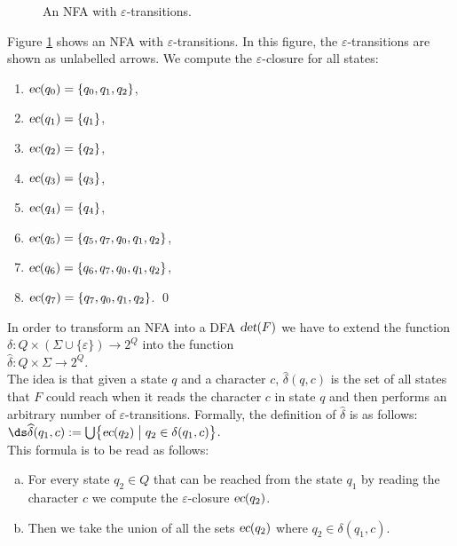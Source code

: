 \begin{figure}[!ht]
  \centering

   \caption{An \textsc{NFA} with $\varepsilon$-transitions.}
  \label{fig:ab-or-ba-star.dot}
\end{figure}

\exampleEng
Figure \ref{fig:ab-or-ba-star.dot} shows an \textsc{NFA} with 
$\varepsilon$-transitions.   In this figure, the $\varepsilon$-transitions are shown as unlabelled arrows.
We compute the $\varepsilon$-closure for all states:
\begin{enumerate}
\item $\textsl{ec}(q_0) = \{ q_0, q_1, q_2 \}$,
\item $\textsl{ec}(q_1) = \{ q_1 \}$,
\item $\textsl{ec}(q_2) = \{ q_2 \}$,
\item $\textsl{ec}(q_3) = \{ q_3 \}$,
\item $\textsl{ec}(q_4) = \{ q_4 \}$,
\item $\textsl{ec}(q_5) = \{ q_5, q_7, q_0, q_1, q_2 \}$,
\item $\textsl{ec}(q_6) = \{ q_6, q_7, q_0, q_1, q_2 \}$,
\item $\textsl{ec}(q_7) = \{ q_7, q_0, q_1, q_2 \}$.
      \qed
\end{enumerate}

\noindent
In order to transform an \textsc{NFA} into a  \textsc{DFA}
$\textsl{det}(F)$ we have to extend the function $\delta:Q  \times (\Sigma \cup \{\varepsilon\}) \rightarrow 2^Q$ into the function
\\[0.2cm]
\hspace*{1.3cm}
$\widehat{\delta}: Q \times \Sigma \rightarrow 2^Q$.
\\[0.2cm]
The idea is that given a state $q$ and a character $c$,  $\widehat{\delta}(q,c)$ is the set of all states that 
$F$ could reach when it reads the character $c$ in state $q$ and then performs an arbitrary number
of $\varepsilon$-transitions.  Formally, the definition of $\widehat{\delta}$ is as follows:
\\[0.2cm]
\hspace*{1.3cm}
$\ds \widehat{\delta}(q_1, c) := \bigcup \bigl\{ \textsl{ec}(q_2) \bigm| q_2 \in \delta(q_1, c) \bigr \}$.
\\[0.2cm]
This formula is to be read as follows:
\begin{enumerate}[(a)]
\item For every state $q_2 \in Q$ that can be reached from the state $q_1$ by reading the character $c$ we
      compute the $\varepsilon$-closure $\textsl{ec}(q_2)$.
\item Then we take the union of all the sets $\textsl{ec}(q_2)$ where $q_2 \in \delta(q_1, c)$.
\end{enumerate}

